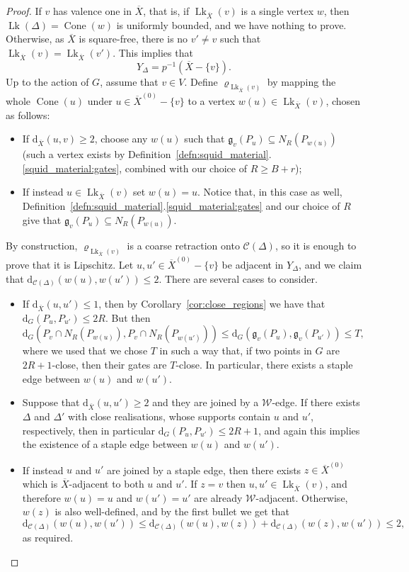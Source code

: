 \documentclass[svgnames]{amsart}
\theoremstyle{plain}
\theoremstyle{definition}
\newcommand{\C}{\mathcal C}
\newcommand{\ov}[1]{\overline{#1}}
\newcommand{\dist}{\mathrm{d}}
\newcommand{\link}{\operatorname{Lk}}
\newcommand{\W}{\mathcal{W}}
\newcommand{\gate}{\mathfrak{g}}
\newcommand{\Squid}{\operatorname{Cone}}
\begin{document}
\begin{proof}
If $v$ has valence one in $\ov X$, that is, if $\link_{\ov X}(v)$ is a single vertex $w$, then $\link(\Delta)=\Squid(w)$ is uniformly bounded, and we have nothing to prove. Otherwise, as $\ov X$ is square-free, there is no $v'\neq v$ such that $\link_{\ov X}(v)=\link_{\ov X}(v')$. This implies that 
$$Y_{\Delta}=p^{-1}(\ov X-\{v\}).$$
Up to the action of $G$, assume that $v\in V$. Define $\varrho_{\link_{\ov X}(v)}$ by mapping the whole $\Squid(u)$ under $u\in\ov{X}^{(0)}-\{v\}$ to a vertex $w(u)\in\link_{\ov X}(v)$, chosen as follows:
\begin{itemize}
    \item If $\dist_{\ov X}(u,v)\ge 2$, choose any $w(u)$ such that $\gate_v(P_u)\subseteq N_R(P_{w(u)})$ (such a vertex exists by Definition~\ref{defn:squid_material}.\eqref{squid_material:gates}, combined with our choice of $R\ge B+r$);
    \item If instead $u\in\link_{\ov X}(v)$ set $w(u)=u$. Notice that, in this case as well, Definition~\ref{defn:squid_material}.\eqref{squid_material:gates} and our choice of $R$ give that $\gate_v(P_u)\subseteq N_R(P_{w(u)})$.
\end{itemize}

By construction, $\varrho_{\link_{\ov X}(v)}$ is a coarse retraction onto $\C(\Delta)$, so it is enough to prove that it is Lipschitz. Let $u,u'\in \ov{X}^{(0)}-\{v\}$ be adjacent in $Y_\Delta$, and we claim that $\dist_{\C(\Delta)}(w(u), w(u'))\le 2$. There are several cases to consider.


\begin{itemize}
    \item If $\dist_{\ov{X}}(u,u')\le 1$, then by Corollary~\ref{cor:close_regions} we have that $\dist_G(P_u, P_{u'})\le 2R$. But then $$\dist_G(P_v\cap N_R(P_{w(u)}), P_v\cap N_R(P_{w(u')}))\le \dist_G(\gate_v(P_u), \gate_v(P_{u'}))\le T,$$
where we used that we chose $T$ in such a way that, if two points in $G$ are $2R+1$-close, then their gates are $T$-close. In particular, there exists a staple edge between $w(u)$ and $w(u')$.
\item Suppose that $\dist_{\ov{X}}(u,u')\ge 2$ and they are joined by a $\W$-edge. If there exists $\Delta$ and $\Delta'$ with close realisations, whose supports contain $u$ and $u'$, respectively, then in particular $\dist_G(P_u, P_{u'})\le 2R+1$, and again this implies the existence of a staple edge between $w(u)$ and $w(u')$.
\item If instead $u$ and $u'$ are joined by a staple edge, then there exists  $z\in\ov{X}^{(0)}$ which is $\ov X$-adjacent to both $u$ and $u'$. If $z=v$ then $u,u'\in\link_{\ov X}(v)$, and therefore $w(u)=u$ and $w(u')=u'$ are already $\W$-adjacent. Otherwise, $w(z)$ is also well-defined, and by the first bullet we get that 
$$\dist_{\C(\Delta)}(w(u), w(u'))\le \dist_{\C(\Delta)}(w(u), w(z))+\dist_{\C(\Delta)}(w(z), w(u'))\le 2,$$
as required.\qedhere
\end{itemize}
\end{proof}
\end{document}
